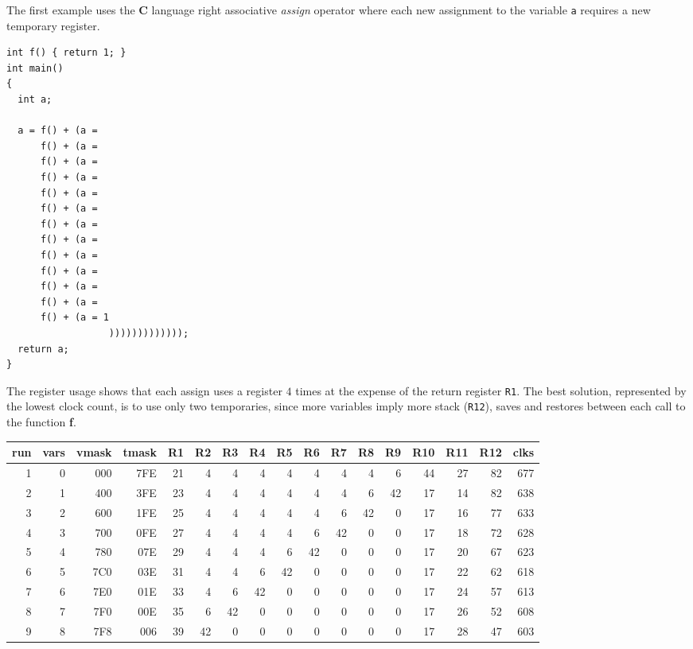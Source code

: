 The first example uses the {\bf C} language right associative {\it assign} operator
where each new assignment to the variable {\tt a} requires a new temporary register.

\begin{verbatim}
int f() { return 1; }
int main()
{
  int a;

  a = f() + (a =
      f() + (a =
      f() + (a =
      f() + (a =
      f() + (a =
      f() + (a =
      f() + (a =
      f() + (a =
      f() + (a =
      f() + (a =
      f() + (a =
      f() + (a =
      f() + (a = 1
                  )))))))))))));
  return a;
}
\end{verbatim}

The register usage shows that each assign uses a register $4$ times at
the expense of the return register {\tt R1}.
The best solution, represented by the lowest clock count,
is to use only two temporaries, since more variables imply more stack ({\tt R12}),
saves and restores between each call to the function {\bf f}.

\begin{center}
{\small
\begin{tabular}{r|r|r|r|r|r|r|r|r|r|r|r|r|r|r|r|r}
run&vars&vmask&tmask&R1&R2&R3&R4&R5&R6&R7&R8&R9&R10&R11&R12&clks\\\hline
1&0&000&7FE&21&4&4&4&4&4&4&4&6&44&27&82&677\\
2&1&400&3FE&23&4&4&4&4&4&4&6&42&17&14&82&638\\
3&2&600&1FE&25&4&4&4&4&4&6&42&0&17&16&77&633\\
4&3&700&0FE&27&4&4&4&4&6&42&0&0&17&18&72&628\\
5&4&780&07E&29&4&4&4&6&42&0&0&0&17&20&67&623\\
6&5&7C0&03E&31&4&4&6&42&0&0&0&0&17&22&62&618\\
7&6&7E0&01E&33&4&6&42&0&0&0&0&0&17&24&57&613\\
8&7&7F0&00E&35&6&42&0&0&0&0&0&0&17&26&52&608\\
9&8&7F8&006&39&42&0&0&0&0&0&0&0&17&28&47&603\\
\end{tabular}
}
\end{center}
\vspace*{5mm}

